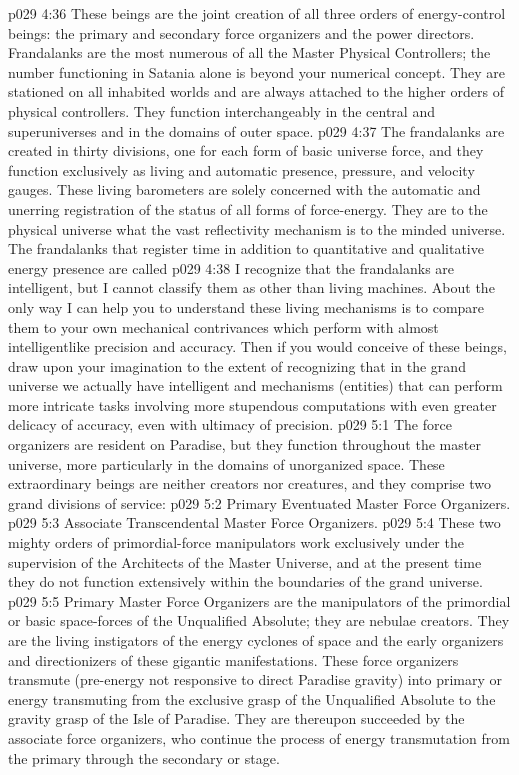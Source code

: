 \vs p029 4:36 \bibnobreakspace {} These beings are the joint creation of all three orders of energy\hyp{}control beings: the primary and secondary force organizers and the power directors. Frandalanks are the most numerous of all the Master Physical Controllers; the number functioning in Satania alone is beyond your numerical concept. They are stationed on all inhabited worlds and are always attached to the higher orders of physical controllers. They function interchangeably in the central and superuniverses and in the domains of outer space.
\vs p029 4:37 The frandalanks are created in thirty divisions, one for each form of basic universe force, and they function exclusively as living and automatic presence, pressure, and velocity gauges. These living barometers are solely concerned with the automatic and unerring registration of the status of all forms of force\hyp{}energy. They are to the physical universe what the vast reflectivity mechanism is to the minded universe. The frandalanks that register time in addition to quantitative and qualitative energy presence are called 
\vs p029 4:38 I recognize that the frandalanks are intelligent, but I cannot classify them as other than living machines. About the only way I can help you to understand these living mechanisms is to compare them to your own mechanical contrivances which perform with almost intelligentlike precision and accuracy. Then if you would conceive of these beings, draw upon your imagination to the extent of recognizing that in the grand universe we actually have intelligent and  mechanisms (entities) that can perform more intricate tasks involving more stupendous computations with even greater delicacy of accuracy, even with ultimacy of precision.
\vs p029 5:1 The force organizers are resident on Paradise, but they function throughout the master universe, more particularly in the domains of unorganized space. These extraordinary beings are neither creators nor creatures, and they comprise two grand divisions of service:
\pc \vs p029 5:2 \bibnobreakspace Primary Eventuated Master Force Organizers.
\vs p029 5:3 \bibnobreakspace Associate Transcendental Master Force Organizers.
\pc \vs p029 5:4 These two mighty orders of primordial\hyp{}force manipulators work exclusively under the supervision of the Architects of the Master Universe, and at the present time they do not function extensively within the boundaries of the grand universe.\plusone
\pc \vs p029 5:5 Primary Master Force Organizers are the manipulators of the primordial or basic space\hyp{}forces of the Unqualified Absolute; they are nebulae creators. They are the living instigators of the energy cyclones of space and the early organizers and directionizers of these gigantic manifestations. These force organizers transmute  (pre\hyp{}energy not responsive to direct Paradise gravity) into primary or  energy transmuting from the exclusive grasp of the Unqualified Absolute to the gravity grasp of the Isle of Paradise. They are thereupon succeeded by the associate force organizers, who continue the process of energy transmutation from the primary through the secondary or  stage.
